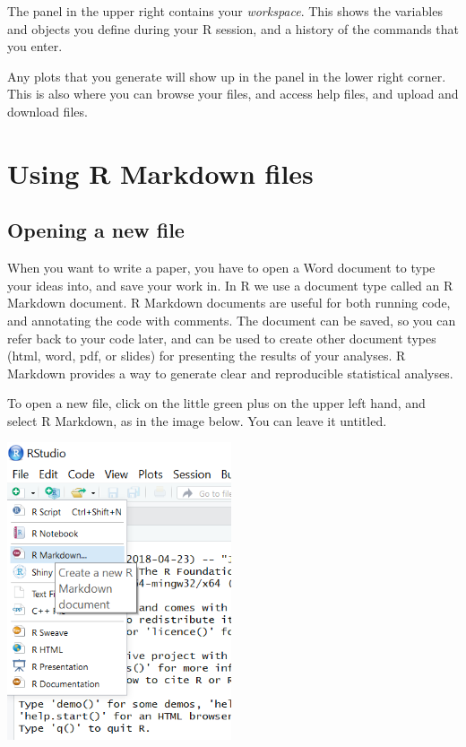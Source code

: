 \documentclass[
]{article}
\begin{document}
The panel in the upper right contains your \emph{workspace}. This shows
the variables and objects you define during your R session, and a
history of the commands that you enter.

Any plots that you generate will show up in the panel in the lower right
corner. This is also where you can browse your files, and access help
files, and upload and download files.

\hypertarget{using-r-markdown-files}{%
\section{Using R Markdown files}\label{using-r-markdown-files}}

\hypertarget{opening-a-new-file}{%
\subsection{Opening a new file}\label{opening-a-new-file}}

When you want to write a paper, you have to open a Word document to type
your ideas into, and save your work in. In R we use a document type
called an R Markdown document. R Markdown documents are useful for both
running code, and annotating the code with comments. The document can be
saved, so you can refer back to your code later, and can be used to
create other document types (html, word, pdf, or slides) for presenting
the results of your analyses. R Markdown provides a way to generate
clear and reproducible statistical analyses.

To open a new file, click on the little green plus on the upper left
hand, and select R Markdown, as in the image below. You can leave it
untitled.

\includegraphics[width=2.60417in,height=\textheight]{figures/how.to.open.rmd.png}
\end{document}
